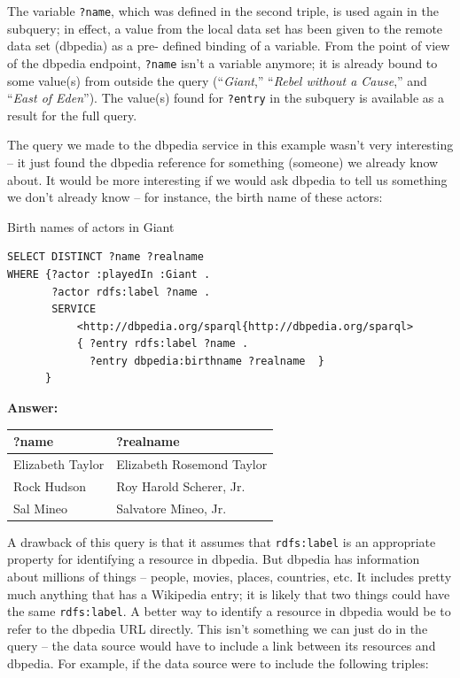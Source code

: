 The variable \texttt{?name}, which was defined in the second triple, is used
again in the subquery; in effect, a value from the local data set has
been given to the remote data set (dbpedia) as a pre- defined binding of
a variable. From the point of view of the dbpedia endpoint, \texttt{?name} isn't
a variable anymore; it is already bound to some value(s) from outside
the query (``\emph{Giant},'' ``\emph{Rebel without a Cause},'' and
``\emph{East of Eden}''). The value(s) found for \texttt{?entry} in the subquery
is available as a result for the full query.

The query we made to the dbpedia service in this example wasn't very
interesting -- it just found the dbpedia reference for something
(someone) we already know about. It would be more interesting
if we would ask dbpedia to tell us something we don't already know --
for instance, the birth name of these actors:

\begin{query}Birth names of actors in Giant\end{query}

\begin{lstlisting}
SELECT DISTINCT ?name ?realname
WHERE {?actor :playedIn :Giant .
       ?actor rdfs:label ?name .
       SERVICE
           <http://dbpedia.org/sparql{http://dbpedia.org/sparql>
           { ?entry rdfs:label ?name .
             ?entry dbpedia:birthname ?realname  }
      }
\end{lstlisting}


\textbf{\textbf{Answer:}}

\begin{tabular}{|ll|}
\hline
?name&?realname\\
\hline
Elizabeth Taylor&Elizabeth Rosemond Taylor\\
Rock Hudson&Roy Harold Scherer, Jr.\\
Sal Mineo&Salvatore Mineo, Jr.\\
\hline
\end{tabular}

A drawback of this query is that it assumes that \texttt{rdfs:label} is an
appropriate property for identifying a resource in dbpedia. But dbpedia
has information about millions of things -- people, movies, places,
countries, etc. It includes pretty much anything that has a Wikipedia
entry; it is likely that two things could have the same \texttt{rdfs:label}. A
better way to identify a resource in dbpedia would be to refer to the
dbpedia URL directly. This isn't something we can just do in the query
-- the data source would have to include a link between its resources
and dbpedia. For example, if the data source were to include the
following triples:

